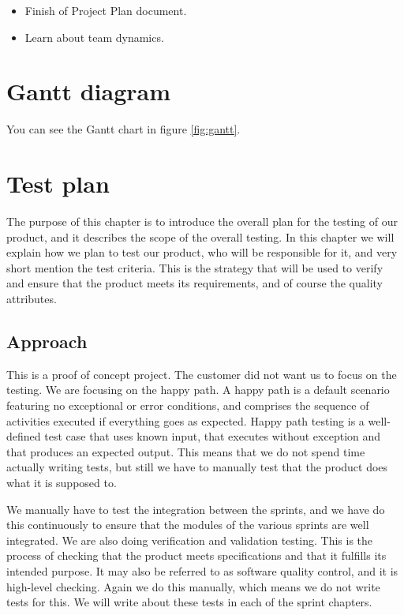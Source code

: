 \begin{itemize}
	\item Finish of Project Plan document.
	\item Learn about team dynamics.
\end{itemize}

\section{Gantt diagram}
You can see the Gantt chart in figure \ref{fig:gantt}.


\section{Test plan}
The purpose of this chapter is to introduce the overall plan for the testing of our product, and it describes the scope of the overall testing.
In this chapter we will explain how we plan to test our product, who will be responsible for it, and very short mention the test criteria.
This is the strategy that will be used to verify and ensure that the product meets its requirements, and of course the quality attributes. 

\subsection{Approach}
This is a proof of concept project. The customer did not want us to focus on the testing. We are focusing on the happy path. A happy path is a default scenario featuring no exceptional or error conditions, and comprises the sequence of activities executed if everything goes as expected. Happy path testing is a well-defined test case that uses known input, that executes without exception and that produces an expected output. This means that we do not spend time actually writing tests, but still we have to manually test that the product does what it is supposed to.

We manually have to test the integration between the sprints, and we have do this continuously to ensure that the modules of the various sprints are well integrated. We are also doing verification and validation testing. This is the process of checking that the product meets specifications and that it fulfills its intended purpose. It may also be referred to as software quality control, and it is high-level checking. Again we do this manually, which means we do not write tests for this. We will write about these tests in each of the sprint chapters. 


